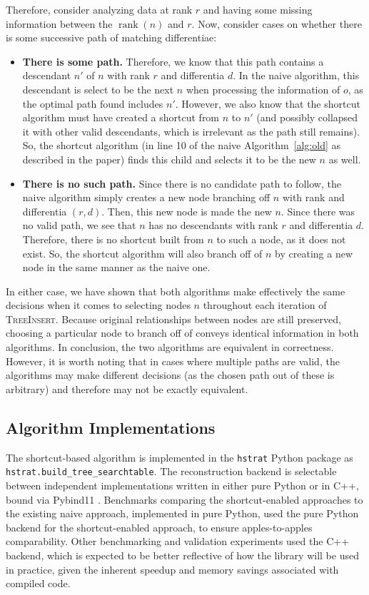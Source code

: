 Therefore, consider analyzing data at rank $r$ and having some missing information between the $\operatorname{rank}(n)$ and $r$.
Now, consider cases on whether there is some successive path of matching differentiae:

\begin{itemize}
  \item \textbf{There is some path.}
  Therefore, we know that this path contains a descendant $n'$ of $n$ with rank $r$ and differentia $d$.
  In the naive algorithm, this descendant is select to be the next $n$ when processing the information of $o$, as the optimal path found includes $n'$.
  However, we also know that the shortcut algorithm must have created a shortcut from $n$ to $n'$ (and possibly collapsed it with other valid descendants, which is irrelevant as the path still remains).
  So, the shortcut algorithm (in line 10 of the naive Algorithm~\ref{alg:old} as described in the paper) finds this child and selects it to be the new $n$ as well.
  \item \textbf{There is no such path.}
  Since there is no candidate path to follow, the naive algorithm simply creates a new node branching off $n$ with rank and differentia $(r, d)$.
  Then, this new node is made the new $n$.
  Since there was no valid path, we see that $n$ has no descendants with rank $r$ and differentia $d$.
  Therefore, there is no shortcut built from $n$ to such a node, as it does not exist.
  So, the shortcut algorithm will also branch off of $n$ by creating a new node in the same manner as the naive one.
\end{itemize}

In either case, we have shown that both algorithms make effectively the same decisions when it comes to selecting nodes $n$ throughout each iteration of \textsc{TreeInsert}.
Because original relationships between nodes are still preserved, choosing a particular node to branch off of conveys identical information in both algorithms.
In conclusion, the two algorithms are equivalent in correctness.
However, it is worth noting that in cases where multiple paths are valid, the algorithms may make different decisions (as the chosen path out of these is arbitrary) and therefore may not be exactly equivalent.

\subsection{Algorithm Implementations}

The shortcut-based algorithm is implemented in the \texttt{hstrat} Python package \citep{moreno2022hstrat} as \texttt{hstrat.build\_tree\_searchtable}.
The reconstruction backend is selectable between independent implementations written in either pure Python or in C++, bound via Pybind11 \citep{wenzel2017pybind11}.
Benchmarks comparing the shortcut-enabled approaches to the existing naive approach, implemented in pure Python, used the pure Python backend for the shortcut-enabled approach, to ensure apples-to-apples comparability.
Other benchmarking and validation experiments used the C++ backend, which is expected to be better reflective of how the library will be used in practice, given the inherent speedup and memory savings associated with compiled code.

